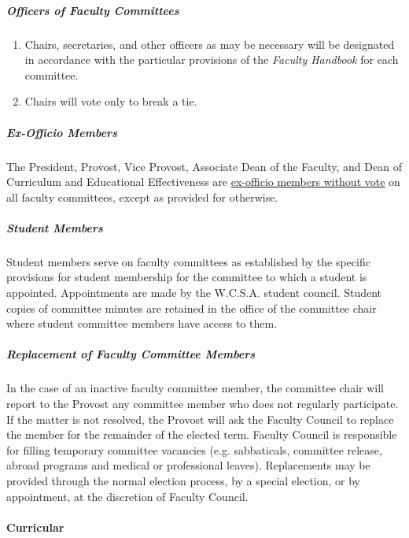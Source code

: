 				\subparagraph{Officers of Faculty Committees}
					\begin{enumerate}[label=\alph*)]
						\item{Chairs, secretaries, and other officers as may be necessary will be designated in accordance with the particular provisions of the \emph{Faculty Handbook} for each committee.}
						\item{Chairs will vote only to break a tie.}
					\end{enumerate}
				\subparagraph{Ex-Officio Members}
					The President, Provost, Vice Provost, Associate Dean of the Faculty, and Dean of Curriculum and Educational Effectiveness are \underline{ex-officio members without vote} on all faculty committees, except as provided for otherwise.
				\subparagraph{Student Members}
					Student members serve on faculty committees as established by the specific provisions for student membership for the committee to which a student is appointed. Appointments are made by the W.C.S.A. student council.  Student copies of committee minutes are retained in the office of the committee chair where student committee members have access to them.
				\subparagraph{Replacement of Faculty Committee Members}

					In the case of an inactive faculty committee member, the committee chair will report to the Provost any committee member who does not regularly participate.  If the matter is not resolved, the Provost will ask the Faculty Council to replace the member for the remainder of the elected term.
					Faculty Council is responsible for filling temporary committee vacancies (e.g. sabbaticals, committee release, abroad programs and medical or professional leaves).  Replacements may be provided through the normal election process, by a special election, or by appointment, at the discretion of Faculty Council.
			\paragraph{Curricular}

